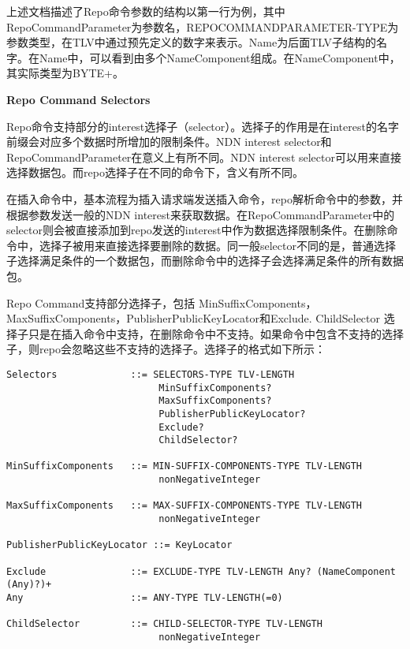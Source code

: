 上述文档描述了Repo命令参数的结构以第一行为例，其中RepoCommandParameter为参数名，REPOCOMMANDPARAMETER-TYPE为参数类型，在TLV中通过预先定义的数字来表示。Name为后面TLV子结构的名字。在Name中，可以看到由多个NameComponent组成。在NameComponent中，其实际类型为BYTE+。

\textbf{Repo Command Selectors}

Repo命令支持部分的interest选择子（selector）。选择子的作用是在interest的名字前缀会对应多个数据时所增加的限制条件。NDN interest selector和RepoCommandParameter在意义上有所不同。NDN interest selector可以用来直接选择数据包。而repo选择子在不同的命令下，含义有所不同。

在插入命令中，基本流程为插入请求端发送插入命令，repo解析命令中的参数，并根据参数发送一般的NDN interest来获取数据。在RepoCommandParameter中的selector则会被直接添加到repo发送的interest中作为数据选择限制条件。在删除命令中，选择子被用来直接选择要删除的数据。同一般selector不同的是，普通选择子选择满足条件的一个数据包，而删除命令中的选择子会选择满足条件的所有数据包。

Repo Command支持部分选择子，包括 MinSuffixComponents，MaxSuffixComponents，PublisherPublicKeyLocator和Exclude. ChildSelector 选择子只是在插入命令中支持，在删除命令中不支持。如果命令中包含不支持的选择子，则repo会忽略这些不支持的选择子。选择子的格式如下所示：
\begin{framed}
\begin{footnotesize}
\begin{verbatim}
Selectors             ::= SELECTORS-TYPE TLV-LENGTH
                           MinSuffixComponents?
                           MaxSuffixComponents?
                           PublisherPublicKeyLocator?
                           Exclude?
                           ChildSelector?

MinSuffixComponents   ::= MIN-SUFFIX-COMPONENTS-TYPE TLV-LENGTH
                           nonNegativeInteger

MaxSuffixComponents   ::= MAX-SUFFIX-COMPONENTS-TYPE TLV-LENGTH
                           nonNegativeInteger

PublisherPublicKeyLocator ::= KeyLocator

Exclude               ::= EXCLUDE-TYPE TLV-LENGTH Any? (NameComponent (Any)?)+
Any                   ::= ANY-TYPE TLV-LENGTH(=0)

ChildSelector         ::= CHILD-SELECTOR-TYPE TLV-LENGTH
                           nonNegativeInteger
\end{verbatim}
\end{footnotesize}
\end{framed}

